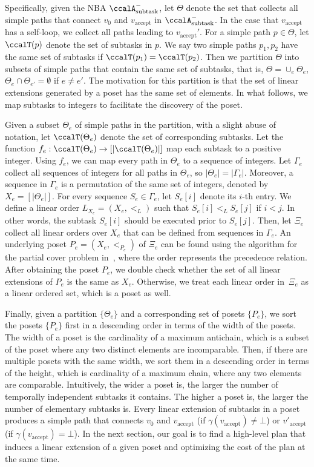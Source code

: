 \documentclass[Afour,sageh,times]{sagej}
\newcommand{\auto}[1]{\ccalA_{\text{#1}}}
\newcommand{\vertex}[1]{v_{\text{#1}}}
\begin{document}
Specifically, given the NBA $\auto{subtask}^-$, let $\Theta$ denote the set that collects all simple paths that connect $v_0$ and $v_{\text{accept}}$ in $\auto{subtask}^-$. In the case that $\vertex{accept}$ has a self-loop, we collect all paths leading to $\vertex{accept}'$.
For a simple path $p\in\Theta$, let $\ccalT(p)$ denote the set of subtasks in $p$. We say two simple paths $p_1, p_2$ have the same set of subtasks if $\ccalT(p_1) =\ccalT(p_2)$. Then we partition $\Theta$ into subsets of  simple paths that contain the same set of subtasks, that is, $\Theta = \cup_e \Theta_e$, $\Theta_e \cap \Theta_{e'} = \emptyset$ if $e\not=e'$. The motivation for this partition is that the set of linear extensions generated by a poset has the same set of elements. {In what follows, we map subtasks to integers to facilitate the discovery of the  poset.}

Given a subset $\Theta_e$ of simple paths in the partition, with a slight abuse of notation, let $\ccalT(\Theta_e)$ denote the set of corresponding  subtasks. Let the function $f_e:\ccalT(\Theta_e)\to [|\ccalT(\Theta_e)|]$ map each subtask to a positive integer. Using $f_e$, we can map every path in $\Theta_e$ to a sequence of integers. Let $\Gamma_e$ collect all sequences of integers for all paths in $\Theta_e$, so $|\Theta_e| =  |\Gamma_e|$. Moreover, a sequence in $\Gamma_e$ is a permutation of the same set of integers, denoted by $X_e = [|\Theta_e|]$. For every sequence $S_e \in \Gamma_e$, let $S_e[i]$ denote its $i$-th entry. We define a linear order $L_{X_e} = (X_e, <_L)$ such that  $S_e[i]  <_L  S_e[j] $ if $i  <  j$. In other words, the subtask $S_e[i]$ should be executed prior to  $S_e[j]$. Then, let $\Xi_e$ collect all linear orders over $X_e$ that can be defined from sequences in $\Gamma_e$. An underlying poset $P_e  = (X_e, <_{P_e})$ of $\Xi_e$ can be found using the algorithm for the partial cover problem in~\cite{heath2013poset}, where the order represents the precedence relation. After obtaining the poset $P_e$, we double check whether the set of all linear extensions of $P_e$ is the same as $X_e$. Otherwise, we treat each linear order in~$\Xi_e$ as a linear ordered set, which is a poset as well.

{Finally, given a partition $\{\Theta_e\}$ and a corresponding set of posets $\{P_e\}$, we sort the posets  $\{P_e\}$ first in a descending order in terms of the width of the posets. The width of a poset  is the cardinality of a maximum antichain, which is a subset of the poset where any two distinct elements are incomparable. Then, if there are multiple posets with the same width, we sort them in a descending order in terms of the height, which is cardinality of a maximum chain, where any two elements are comparable. Intuitively, the wider a poset is, the larger the number of temporally independent subtasks it contains. The higher a poset is, the  larger the number of elementary subtasks is.} Every linear extension of subtasks in a poset produces a simple path that connects $v_0$ and $v_{\text{accept}}$ (if $\gamma(v_{\text{accept}}) \neq \bot$) or $v'_{\text{accept}}$ (if $\gamma(v_{\text{accept}}) = \bot$). In the next section, our goal is to find a high-level plan that induces a linear extension of a given poset and optimizing the cost of the plan at the same time.
\end{document}
